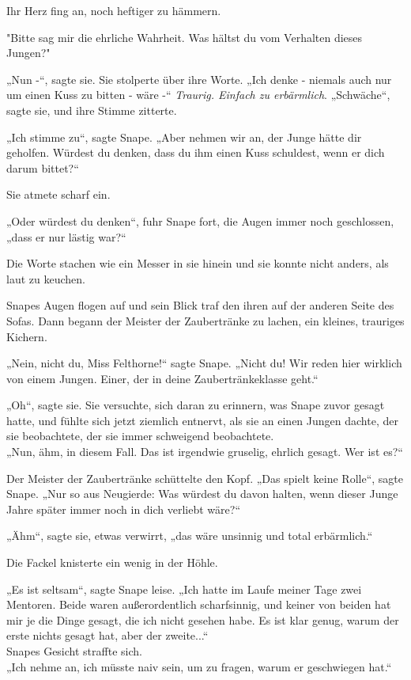 {Ihr Herz fing an, noch heftiger zu hämmern.

"Bitte sag mir die ehrliche Wahrheit. Was hältst du vom Verhalten dieses Jungen?"

„Nun -“, sagte sie. Sie stolperte über ihre Worte. „Ich denke - niemals auch nur um einen Kuss zu bitten - wäre -“ \emph{Traurig. Einfach zu erbärmlich}. „Schwäche“, sagte sie, und ihre Stimme zitterte.

„Ich stimme zu“, sagte Snape. „Aber nehmen wir an, der Junge hätte dir geholfen. Würdest du denken, dass du ihm einen Kuss schuldest, wenn er dich darum bittet?“

Sie atmete scharf ein.

„Oder würdest du denken“, fuhr Snape fort, die Augen immer noch geschlossen, „dass er nur lästig war?“

Die Worte stachen wie ein Messer in sie hinein und sie konnte nicht anders, als laut zu keuchen.

Snapes Augen flogen auf und sein Blick traf den ihren auf der anderen Seite des Sofas. Dann begann der Meister der Zaubertränke zu lachen, ein kleines, trauriges Kichern.

„Nein, nicht du, Miss Felthorne!“ sagte Snape. „Nicht du! Wir reden hier wirklich von einem Jungen. Einer, der in deine Zaubertränkeklasse geht.“

„Oh“, sagte sie. Sie versuchte, sich daran zu erinnern, was Snape zuvor gesagt hatte, und fühlte sich jetzt ziemlich entnervt, als sie an einen Jungen dachte, der sie beobachtete, der sie immer schweigend beobachtete.\\ „Nun, ähm, in diesem Fall. Das ist irgendwie gruselig, ehrlich gesagt. Wer ist es?“

Der Meister der Zaubertränke schüttelte den Kopf. „Das spielt keine Rolle“, sagte Snape. „Nur so aus Neugierde: Was würdest du davon halten, wenn dieser Junge Jahre später immer noch in dich verliebt wäre?“

„Ähm“, sagte sie, etwas verwirrt, „das wäre unsinnig und total erbärmlich.“

Die Fackel knisterte ein wenig in der Höhle.

„Es ist seltsam“, sagte Snape leise. „Ich hatte im Laufe meiner Tage zwei Mentoren. Beide waren außerordentlich scharfsinnig, und keiner von beiden hat mir je die Dinge gesagt, die ich nicht gesehen habe. Es ist klar genug, warum der erste nichts gesagt hat, aber der zweite...“\\ Snapes Gesicht straffte sich.\\ „Ich nehme an, ich müsste naiv sein, um zu fragen, warum er geschwiegen hat.“

}

